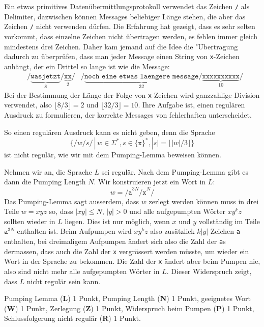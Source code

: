 Ein etwas primitives Datenübermittlungsprotokoll verwendet
das Zeichen \texttt{/} als Delimiter, dazwischen können Messages beliebiger
Länge stehen, die aber das Zeichen \texttt{/} nicht verwenden dürfen.
Die Erfahrung hat gezeigt, dass es sehr selten vorkommt, dass einzelne
Zeichen nicht übertragen werden, es fehlen immer gleich mindestens drei
Zeichen. Daher kam jemand auf die Idee die "Ubertragung dadurch zu überprüfen,
dass man jeder Message einen String von \texttt{x}-Zeichen anhängt, der
ein Drittel so lange ist wie die Message:
\begin{align*}
&\texttt{/}\underbrace{\texttt{wasjetzt}}_8\texttt{/}\underbrace{\texttt{xx}}_2\texttt{/}
&\texttt{/}\underbrace{\texttt{noch eine etwas laengere message}}_{32}\texttt{/}\underbrace{\texttt{xxxxxxxxxx}}_{10}\texttt{/}
\end{align*}
Bei der Bestimmung der Länge der Folge von \texttt{x}-Zeichen wird ganzzahlige
Division verwendet, also $\lfloor 8 / 3\rfloor = 2$ und $\lfloor 32 / 3 \rfloor = 10$.
Ihre Aufgabe ist, einen regulären Ausdruck zu formulieren, der korrekte
Messages von fehlerhaften unterscheidet.

\begin{loesung}
So einen regulären Ausdruck kann es nicht geben, denn die Sprache 
\[
\{ \texttt{/}w\texttt{/}s\texttt{/}\, |\, w\in \Sigma^*, s\in\{\texttt{x}\}^*,
|s| = \lfloor |w|/3\rfloor
\}
\]
ist nicht regulär, wie wir mit dem Pumping-Lemma beweisen können.

Nehmen wir an, die Sprache $L$ sei regulär. Nach dem Pumping-Lemma gibt
es dann die Pumping Length $N$. Wir konstruieren jetzt ein Wort in $L$:
\[
w=
\texttt{/a}^{3N}\texttt{/x}^N\texttt{/}
\]
Das Pumping-Lemma sagt ausserdem, dass $w$ zerlegt werden können muss in
drei Teile $w=xyz$ so, dass $|xy|\le N$, $|y|>0$ und alle aufgepumpten
Wörter $xy^kz$ sollten wieder in $L$ liegen. Dies ist nur möglich,
wenn $x$ und $y$ vollständig im Teile $\texttt{a}^{3N}$ enthalten ist.
Beim Aufpumpen wird $xy^kz$ also zusätzlick $k|y|$ Zeichen \texttt{a}
enthalten, bei dreimaligem Aufpumpen ändert sich also die Zahl der 
\texttt{a}s dermassen, dass auch die Zahl der \texttt{x} vergrössert
werden müsste, um wieder ein Wort in der Sprache zu bekommen. Die Zahl
der \texttt{x} ändert aber beim Pumpen nie, also sind nicht mehr alle
aufgepumpten Wörter in $L$. Dieser Widerspruch zeigt, dass $L$ nicht
regulär sein kann.
\end{loesung}

\begin{bewertung}
Pumping Lemma (\textbf{L}) 1 Punkt, Pumping Length (\textbf{N}) 1 Punkt,
geeignetes Wort (\textbf{W}) 1 Punkt, Zerlegung (\textbf{Z}) 1 Punkt,
Widerspruch beim Pumpen (\textbf{P}) 1 Punkt,
Schlussfolgerung nicht regulär (\textbf{R}) 1 Punkt.
\end{bewertung}
